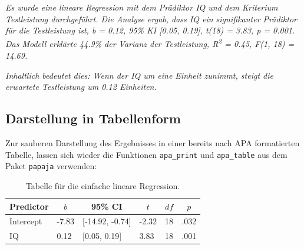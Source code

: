 \documentclass[
]{book}
\newenvironment{Shaded}{\begin{snugshade}}{\end{snugshade}}
\newcommand{\AttributeTok}[1]{\textcolor[rgb]{0.13,0.29,0.53}{#1}}
\newcommand{\FunctionTok}[1]{\textcolor[rgb]{0.13,0.29,0.53}{\textbf{#1}}}
\newcommand{\NormalTok}[1]{#1}
\newcommand{\OtherTok}[1]{\textcolor[rgb]{0.56,0.35,0.01}{#1}}
\newcommand{\SpecialCharTok}[1]{\textcolor[rgb]{0.81,0.36,0.00}{\textbf{#1}}}
\newcommand{\StringTok}[1]{\textcolor[rgb]{0.31,0.60,0.02}{#1}}
\begin{document}
\emph{Es wurde eine lineare Regression mit dem Prädiktor IQ und dem Kriterium Testleistung durchgeführt. Die Analyse ergab, dass IQ ein signifikanter Prädiktor für die Testleistung ist, b = 0.12, 95\% KI {[}0.05, 0.19{]}, t(18) = 3.83, p = 0.001. Das Modell erklärte 44.9\% der Varianz der Testleistung, R\textsuperscript{2} = 0.45, F(1, 18) = 14.69.}

\emph{Inhaltlich bedeutet dies: Wenn der IQ um eine Einheit zunimmt, steigt die erwartete Testleistung um 0.12 Einheiten.}

\subsection{Darstellung in Tabellenform}\label{darstellung-in-tabellenform-5}

Zur sauberen Darstellung des Ergebnisses in einer bereits nach APA formatierten Tabelle, lassen sich wieder die Funktionen \texttt{apa\_print} und \texttt{apa\_table} aus dem Paket \texttt{papaja} verwenden:

\begin{Shaded}
\end{Shaded}

\begin{table}[tbp]

\begin{center}
\begin{threeparttable}

\caption{\label{tab:unnamed-chunk-364}Tabelle für die einfache lineare Regression.}

\begin{tabular}{llllll}
\toprule
Predictor & \multicolumn{1}{c}{$b$} & \multicolumn{1}{c}{95\% CI} & \multicolumn{1}{c}{$t$} & \multicolumn{1}{c}{$\mathit{df}$} & \multicolumn{1}{c}{$p$}\\
\midrule
Intercept & -7.83 & {}[-14.92, -0.74] & -2.32 & 18 & .032\\
IQ & 0.12 & {}[0.05, 0.19] & 3.83 & 18 & .001\\
\bottomrule
\end{tabular}

\end{threeparttable}
\end{center}

\end{table}


\end{document}
